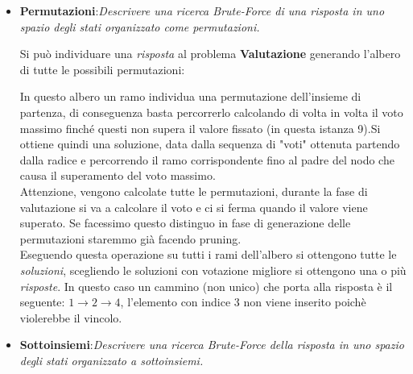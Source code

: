 \documentclass[a4paper]{article}
\begin{document}
\begin{itemize}
	\item \textbf{Permutazioni}:\emph{Descrivere una ricerca Brute-Force di una risposta in uno spazio degli stati organizzato come permutazioni.}

		Si può individuare una \emph{risposta} al problema \textbf{Valutazione} generando l'albero di tutte le possibili permutazioni:
		\begin{center}	
		\end{center}
		In questo albero un ramo individua una permutazione dell'insieme di partenza, di conseguenza basta percorrerlo calcolando di volta in volta il voto massimo finché questi non supera il valore fissato (in questa istanza 9).Si ottiene quindi una soluzione, data dalla sequenza di "voti" ottenuta partendo dalla radice e percorrendo il ramo corrispondente fino al padre del nodo che causa il superamento del voto massimo.\\
		Attenzione, vengono calcolate tutte le permutazioni, durante la fase di valutazione si va a calcolare il voto e ci si ferma quando il valore viene superato.
		Se facessimo questo distinguo in fase di generazione delle permutazioni staremmo già facendo pruning.\\
		Eseguendo questa operazione su tutti i rami dell'albero si ottengono tutte le \emph{soluzioni}, scegliendo le soluzioni con votazione migliore si ottengono una o più \emph{risposte}.
		In questo caso un cammino (non unico) che porta alla risposta è il seguente: $1 \rightarrow 2 \rightarrow 4$, l'elemento con indice 3 non viene inserito poichè violerebbe il vincolo.
	\item \textbf{Sottoinsiemi}:\emph{Descrivere una ricerca Brute-Force della risposta in uno spazio degli stati organizzato a sottoinsiemi.}


\end{itemize}
\end{document}
